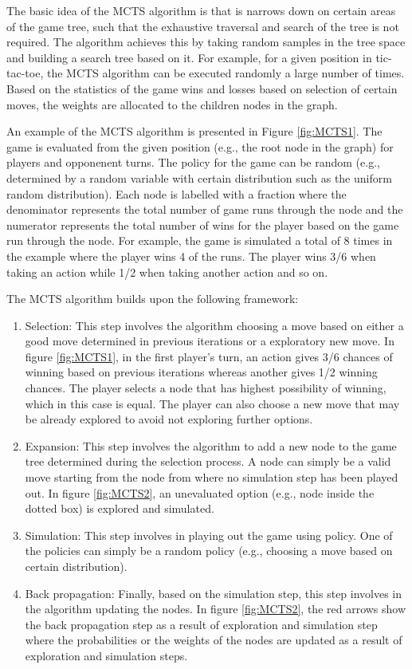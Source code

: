 The basic idea of the \ac{MCTS} algorithm is that is narrows down on certain areas of the game tree, such that the exhaustive traversal and search of the tree is not required. The algorithm achieves this by taking random samples in the tree space and building a search tree based on it. For example, for a given position in tic-tac-toe, the \ac{MCTS} algorithm can be executed randomly a large number of times. Based on the statistics of the game wins and losses based on selection of certain moves, the weights are allocated to the children nodes in the graph.

An example of the \ac{MCTS} algorithm is presented in Figure \ref{fig:MCTS1}. The game is evaluated from the given position (e.g., the root node in the graph) for players and opponenent turns. The policy for the game can be random (e.g., determined by a random variable with certain distribution such as the uniform random distribution). Each node is labelled with a fraction where the denominator represents the total number of game runs through the node and the numerator represents the total number of wins for the player based on the game run through the node. For example, the game is simulated a total of 8 times in the example where the player wins 4 of the runs. The player wins 3/6 when taking an action while 1/2 when taking another action and so on.

The \ac{MCTS} algorithm builds upon the following framework:
\begin{enumerate}
    \item Selection: This step involves the algorithm choosing a move based on either a good move determined in previous iterations or a exploratory new move. In figure \ref{fig:MCTS1}, in the first player's turn, an action gives 3/6 chances of winning based on previous iterations whereas another gives 1/2 winning chances. The player selects a node that has highest possibility of winning, which in this case is equal. The player can also choose a new move that may be already explored to avoid not exploring further options.
    \item Expansion: This step involves the algorithm to add a new node to the game tree determined during the selection process. A node can simply be a valid move starting from the node from where no simulation step has been played out. In figure \ref{fig:MCTS2}, an unevaluated option (e.g., node inside the dotted box) is explored and simulated.
    \item Simulation: This step involves in playing out the game using policy. One of the policies can simply be a random policy (e.g., choosing a move based on certain distribution).
    \item Back propagation: Finally, based on the simulation step, this step involves in the algorithm updating the nodes. In figure \ref{fig:MCTS2}, the red arrows show the back propagation step as a result of exploration and simulation step where the probabilities or the weights of the nodes are updated as a result of exploration and simulation steps.
\end{enumerate}

